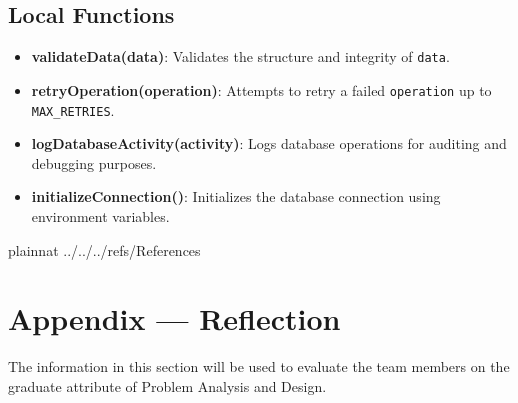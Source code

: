 \documentclass[12pt, titlepage]{article}
\begin{document}
\subsection{Local Functions}
\begin{itemize}
    \item \textbf{validateData(data)}: Validates the structure and integrity of \texttt{data}.
    \item \textbf{retryOperation(operation)}: Attempts to retry a failed \texttt{operation} up to \texttt{MAX\_RETRIES}.
    \item \textbf{logDatabaseActivity(activity)}: Logs database operations for auditing and debugging purposes.
    \item \textbf{initializeConnection()}: Initializes the database connection using environment variables.
\end{itemize}

 {plainnat}
 {../../../refs/References}

\newpage


\section*{Appendix --- Reflection}

The information in this section will be used to evaluate the team members on the
graduate attribute of Problem Analysis and Design.
\end{document}
